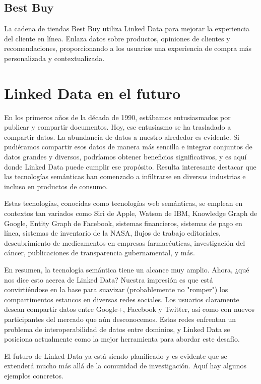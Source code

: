 \documentclass[11pt]{report}
\begin{document}
\section{Best Buy}

		La cadena de tiendas Best Buy utiliza Linked Data para mejorar la experiencia del cliente en línea. Enlaza datos sobre productos, opiniones de clientes y recomendaciones, proporcionando a los usuarios una experiencia de compra más personalizada y contextualizada.

\chapter{Linked Data en el futuro}
En los primeros años de la década de 1990, estábamos entusiasmados por publicar y compartir documentos. Hoy, ese entusiasmo se ha trasladado a compartir datos. La abundancia de datos a nuestro alrededor es evidente. Si pudiéramos compartir esos datos de manera más sencilla e integrar conjuntos de datos grandes y diversos, podríamos obtener beneficios significativos, y es aquí donde Linked Data puede cumplir ese propósito. Resulta interesante destacar que las tecnologías semánticas han comenzado a infiltrarse en diversas industrias e incluso en productos de consumo.

Estas tecnologías, conocidas como tecnologías web semánticas, se emplean en contextos tan variados como Siri de Apple, Watson de IBM, Knowledge Graph de Google, Entity Graph de Facebook, sistemas financieros, sistemas de pago en línea, sistemas de inventario de la NASA, flujos de trabajo editoriales, descubrimiento de medicamentos en empresas farmacéuticas, investigación del cáncer, publicaciones de transparencia gubernamental, y más.

En resumen, la tecnología semántica tiene un alcance muy amplio. Ahora, ¿qué nos dice esto acerca de Linked Data? Nuestra impresión es que está convirtiéndose en la base para suavizar (probablemente no "romper") los compartimentos estancos en diversas redes sociales. Los usuarios claramente desean compartir datos entre Google+, Facebook y Twitter, así como con nuevos participantes del mercado que aún desconocemos. Estas redes enfrentan un problema de interoperabilidad de datos entre dominios, y Linked Data se posiciona actualmente como la mejor herramienta para abordar este desafío.

El futuro de Linked Data ya está siendo planificado y es evidente que se extenderá mucho más allá de la comunidad de investigación. Aquí hay algunos ejemplos concretos.
\end{document}
